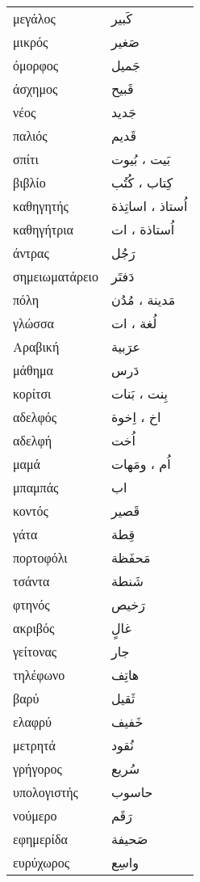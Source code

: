 \documentclass[twocolumn,a4paper]{article}
\newcommand{\ar}[1]{\textarabic{#1}}
\newcommand{\pl}{\raisebox{0.15ex}{\footnotesize ◍}}
\newcommand{\normpl}[1]{\ar{ #1، ات }}
\begin{document}
\begin{mpsupertabular}{ P{0.5\textwidth} P{0.5\textwidth} }
μεγάλος     & \ar{ كَبير } \\
μικρός      & \ar{ صَغير } \\
όμορφος     & \ar{ جَميل } \\
άσχημος     & \ar{ قَبيح } \\
νέος        & \ar{ جَديد } \\
παλιός      & \ar{ قَديم } \\
σπίτι \pl   & \ar{ بَيت ، بُيوت } \\
βιβλίο \pl  & \ar{ كِتاب ، كُتُب } \\
καθηγητής  \pl & \ar{ اُستاذ ، اساتِذة } \\
καθηγήτρια \pl & \normpl{ اُستاذة } \\
άντρας      & \ar{ رَجُل } \\
σημειωματάρειο & \ar{ دَفتَر } \\
πόλη \pl    & \ar{ مَدينة ، مُدُن } \\
γλώσσα \pl  & \normpl{ لُغة } \\
Αραβική     & \ar{ عرَبية } \\
μάθημα      & \ar{ دَرس } \\
κορίτσι \pl & \ar{ بِنت ، بَنات } \\
αδελφός \pl & \ar{ اخ ، اِخوة } \\
αδελφή      & \ar{ اُخت } \\
μαμά \pl    & \ar{ اُم ، ومَهات} \\
μπαμπάς     & \ar{ اب } \\
κοντός      & \ar{ قَصير } \\
γάτα        & \ar{ قِطة } \\
πορτοφόλι   & \ar{ مَحفَظة } \\
τσάντα      & \ar{ شَنطة } \\
φτηνός      & \ar{ رَخيص } \\
ακριβός     & \ar{ غالٍ } \\
γείτονας    & \ar{ جار } \\
τηλέφωνο    & \ar{ هاتِف } \\
βαρύ        & \ar{ ثَقيل } \\
ελαφρύ      & \ar{ خَفيف } \\
μετρητά     & \ar{ نُقود } \\
γρήγορος    & \ar{ سُريع } \\
υπολογιστής & \ar{ حاسوب } \\
νούμερο     & \ar{ رَقَم } \\
εφημερίδα   & \ar{ صَحيفة } \\
ευρύχωρος   & \ar{ واسِع } \\

\end{mpsupertabular}
\end{document}

